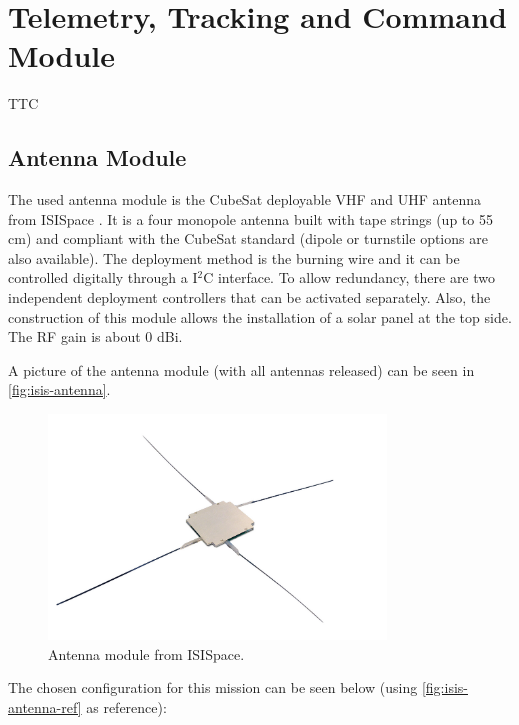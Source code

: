 \section{Telemetry, Tracking and Command Module}

TTC \cite{ttc}

\subsection{Antenna Module}

The used antenna module is the CubeSat deployable VHF and UHF antenna from ISISpace \cite{isis-antenna}. It is a four monopole antenna built with tape strings (up to 55 cm) and compliant with the CubeSat standard (dipole or turnstile options are also available). The deployment method is the burning wire and it can be controlled digitally through a I$^{2}$C interface. To allow redundancy, there are two independent deployment controllers that can be activated separately. Also, the construction of this module allows the installation of a solar panel at the top side. The RF gain is about 0 dBi.

A picture of the antenna module (with all antennas released) can be seen in \autoref{fig:isis-antenna}.

\begin{figure}[!ht]
    \begin{center}
        \includegraphics[width=0.8\textwidth]{figures/isis-antenna}
        \caption{Antenna module from ISISpace.}
        \label{fig:isis-antenna}
    \end{center}
\end{figure}

The chosen configuration for this mission can be seen below (using \autoref{fig:isis-antenna-ref} as reference):

